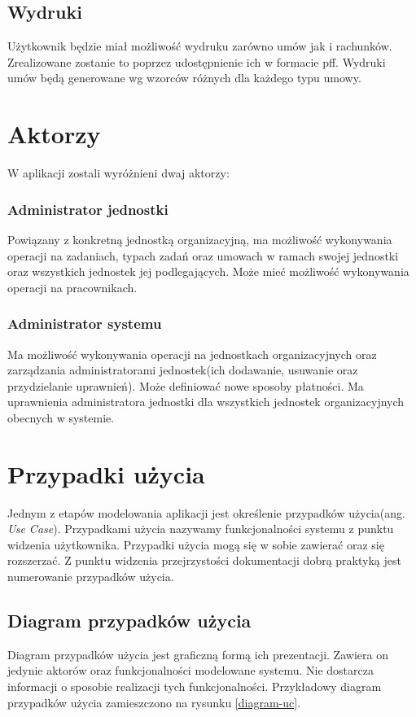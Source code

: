\subsection[Wydruki][Wydruki]{Wydruki}
Użytkownik będzie miał możliwość wydruku zarówno umów jak i rachunków. Zrealizowane zostanie to poprzez udostępnienie ich w formacie pff. Wydruki umów będą generowane wg wzorców różnych dla każdego typu umowy.

\section[Aktorzy][Aktorzy]{Aktorzy}
W aplikacji zostali wyróżnieni dwaj aktorzy:

\subsubsection{Administrator jednostki}
Powiązany z konkretną jednostką organizacyjną, ma możliwość wykonywania operacji na zadaniach, typach zadań oraz umowach w ramach swojej jednostki oraz wszystkich jednostek jej podlegających. Może mieć możliwość wykonywania operacji na pracownikach.

\subsubsection{Administrator systemu}
Ma możliwość wykonywania operacji na jednostkach organizacyjnych oraz zarządzania administratorami jednostek(ich dodawanie, usuwanie oraz przydzielanie uprawnień). Może definiować nowe sposoby płatności. Ma uprawnienia administratora jednostki dla wszystkich jednostek organizacyjnych obecnych w systemie.

\section[Przypadki użycia][Przypadki użycia]{Przypadki użycia}
Jednym z etapów modelowania aplikacji jest określenie przypadków użycia(ang. \textit{Use Case}). Przypadkami użycia nazywamy funkcjonalności systemu z punktu widzenia użytkownika. Przypadki użycia mogą się w sobie zawierać oraz się rozszerzać. Z punktu widzenia przejrzystości dokumentacji dobrą praktyką jest numerowanie przypadków użycia.

\subsection[Diagram przypadków użycia][Diagram przypadków użycia]{Diagram przypadków użycia}
Diagram przypadków użycia jest graficzną formą ich prezentacji. Zawiera on jedynie aktorów oraz funkcjonalności modelowane systemu. Nie dostarcza informacji o sposobie realizacji tych funkcjonalności. Przykładowy diagram przypadków użycia zamieszczono na rysunku \ref{diagram-uc}.


